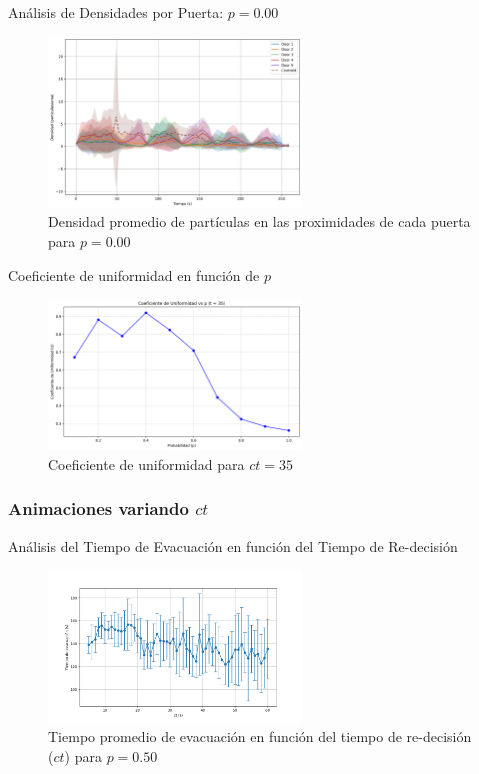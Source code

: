 \documentclass[aspectratio=169]{beamer}
\begin{document}
\begin{frame}{Análisis de Densidades por Puerta: $p = 0.00$}
    \begin{figure}[H]
        \centering
        \includegraphics[width=0.6\textwidth]{img/circular_density_t_20_&_p_0.00.png}
        \caption{Densidad promedio de partículas en las proximidades de cada puerta para $p=0.00$}
        \label{fig:densidad_p000}
    \end{figure}
\end{frame}


\begin{frame}{Coeficiente de uniformidad en función de $p$}
    \begin{figure}[H]
        \centering
        \includegraphics[width=0.6\textwidth]{img/uniformity_vs_p_t35.png}
        \caption{Coeficiente de uniformidad para $ct=35$}
        \label{fig:flow_p100}
    \end{figure}
\end{frame}

\begin{frame}
    \frametitle{Animaciones variando $ct$}
\end{frame}

\begin{frame}{Análisis del Tiempo de Evacuación en función del Tiempo de Re-decisión}
    \begin{figure}[H]
        \centering
        \includegraphics[width=0.6\textwidth]{img/evacuation_times_p_0.5.png}
        \caption{Tiempo promedio de evacuación en función del tiempo de re-decisión ($ct$) para $p=0.50$}
        \label{fig:evac_time_ct}
    \end{figure}    
\end{frame}
\end{document}
